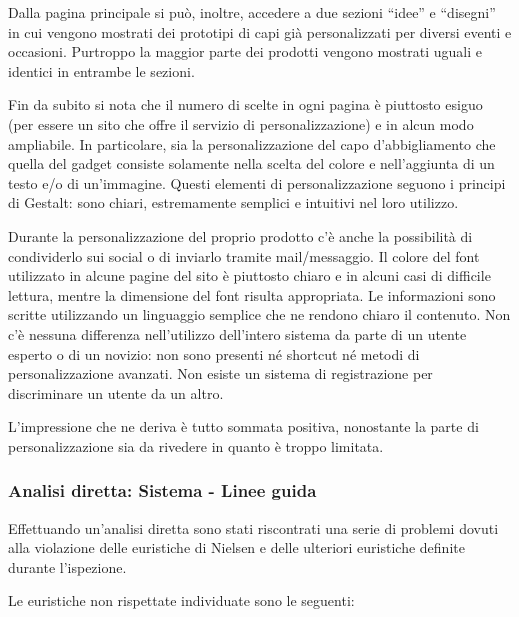 \documentclass[12pt,italian,]{report}
\begin{document}
Dalla pagina principale si può, inoltre, accedere a due sezioni ``idee''
e ``disegni'' in cui vengono mostrati dei prototipi di capi già
personalizzati per diversi eventi e occasioni. Purtroppo la maggior
parte dei prodotti vengono mostrati uguali e identici in entrambe le
sezioni.

Fin da subito si nota che il numero di scelte in ogni pagina è piuttosto
esiguo (per essere un sito che offre il servizio di personalizzazione) e
in alcun modo ampliabile. In particolare, sia la personalizzazione del
capo d'abbigliamento che quella del gadget consiste solamente nella
scelta del colore e nell'aggiunta di un testo e/o di un'immagine. Questi
elementi di personalizzazione seguono i principi di Gestalt: sono
chiari, estremamente semplici e intuitivi nel loro utilizzo.

Durante la personalizzazione del proprio prodotto c'è anche la
possibilità di condividerlo sui social o di inviarlo tramite
mail/messaggio. Il colore del font utilizzato in alcune pagine del sito
è piuttosto chiaro e in alcuni casi di difficile lettura, mentre la
dimensione del font risulta appropriata. Le informazioni sono scritte
utilizzando un linguaggio semplice che ne rendono chiaro il contenuto.
Non c'è nessuna differenza nell'utilizzo dell'intero sistema da parte di
un utente esperto o di un novizio: non sono presenti né shortcut né
metodi di personalizzazione avanzati. Non esiste un sistema di
registrazione per discriminare un utente da un altro.

L'impressione che ne deriva è tutto sommata positiva, nonostante la
parte di personalizzazione sia da rivedere in quanto è troppo limitata.

\hypertarget{analisi-diretta-sistema---linee-guida}{%
\subsubsection{Analisi diretta: Sistema - Linee
guida}\label{analisi-diretta-sistema---linee-guida}}

Effettuando un'analisi diretta sono stati riscontrati una serie di
problemi dovuti alla violazione delle euristiche di Nielsen e delle
ulteriori euristiche definite durante l'ispezione.

Le euristiche non rispettate individuate sono le seguenti:
\end{document}
